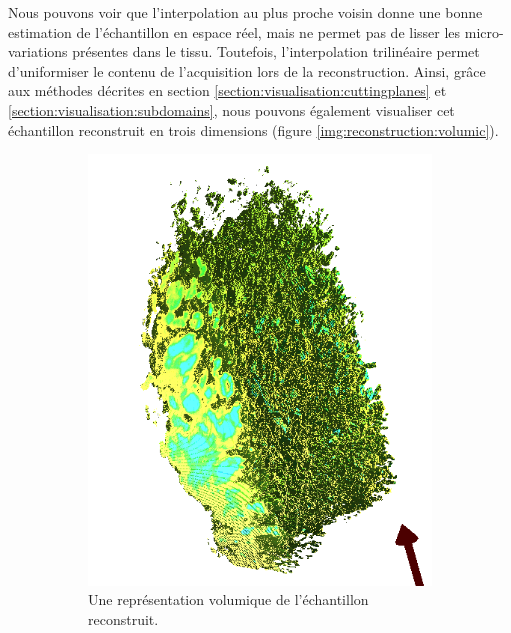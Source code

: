 {{{            Nous pouvons voir que l'interpolation au plus proche voisin donne une bonne estimation de l'échantillon en espace réel, mais ne permet pas de lisser les micro-variations présentes dans le tissu. Toutefois, l'interpolation trilinéaire permet d'uniformiser le contenu de l'acquisition lors de la reconstruction. Ainsi, grâce aux méthodes décrites en section \ref{section:visualisation:cuttingplanes} et \ref{section:visualisation:subdomains}, nous pouvons également visualiser cet échantillon reconstruit en trois dimensions (figure \ref{img:reconstruction:volumic}).
            
            \begin{figure}[h]
                \centering
                \begin{subfigure}{.48\linewidth}
                    \centering
                    \includegraphics[width=.9\linewidth]{img/results/3D/volumic_01.png}
                    \captionsetup{width=.8\linewidth}
                    \caption{Une représentation volumique de l'échantillon reconstruit.}
                    \label{img:reconstruction:volumic:01}
                \end{subfigure}
                \begin{subfigure}{.48\linewidth}

\end{subfigure}
\end{figure}}}}
